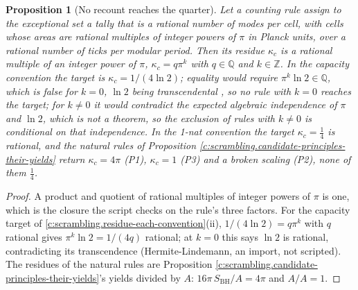 \documentclass[11pt]{article}
\newtheorem{proposition}[theorem]{Proposition}
\theoremstyle{definition}
\theoremstyle{plain}
\newcommand{\changedmark}[2]{\marginpar{\raggedright\scriptsize\color{#1}#2}}
\providecommand{\SBH}{}\renewcommand{\SBH}{S_{\mathrm{BH}}}
\begin{document}
\begin{proposition}[No recount reaches the quarter]\label{c:scrambling.no-recount-reaches-quarter}
\changedmark{gray}{reworded}
Let a counting rule assign to the exceptional set a tally that is a rational number of modes per cell, with cells whose areas are rational multiples of integer powers of $\pi$ in Planck units, over a rational number of ticks per modular period. Then its residue $\kappa_c$ is a rational multiple of an integer power of $\pi$, $\kappa_c = q\pi^k$ with $q \in \mathbb{Q}$ and $k \in \mathbb{Z}$. In the capacity convention the target is $\kappa_c = 1/(4\ln 2)$; equality would require $\pi^k\ln 2 \in \mathbb{Q}$, which is false for $k = 0$, $\ln 2$ being transcendental \cite[Thm.~1.4]{Baker1975}, so no rule with $k = 0$ reaches the target; for $k \neq 0$ it would contradict the expected algebraic independence of $\pi$ and $\ln 2$, which is not a theorem, so the exclusion of rules with $k \neq 0$ is conditional on that independence. In the 1-nat convention the target $\kappa_c = \tfrac14$ is rational, and the natural rules of Proposition \ref{c:scrambling.candidate-principles-their-yields} return $\kappa_c = 4\pi$ (P1), $\kappa_c = 1$ (P3) and a broken scaling (P2), none of them $\tfrac14$.
\end{proposition}
\begin{proof}
A product and quotient of rational multiples of integer powers of $\pi$ is one, which is the closure the script checks on the rule's three factors. For the capacity target of \ref{c:scrambling.residue-each-convention}(ii), $1/(4\ln 2) = q\pi^k$ with $q$ rational gives $\pi^k\ln 2 = 1/(4q)$ rational; at $k = 0$ this says $\ln 2$ is rational, contradicting its transcendence (Hermite-Lindemann, an import, not scripted). The residues of the natural rules are Proposition \ref{c:scrambling.candidate-principles-their-yields}'s yields divided by $A$: $16\pi\,\SBH/A = 4\pi$ and $A/A = 1$.

\end{proof}
\end{document}
